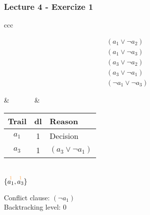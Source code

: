 \begin{frame}
\begin{columns}
    \begin{column}{5cm}
      \begin{overlayarea}{5cm}{5cm}
	\only<1|handout:0>{\scalebox{.6}{}}
	\only<2|handout:0>{\scalebox{.6}{}}
	\only<3,4,5|handout:0>{\scalebox{.6}{}}
	\only<6,7|handout:0>{\scalebox{.6}{}}
	\only<8|handout:0>{\scalebox{.6}{}}
	\only<9|handout:0>{\scalebox{.6}{}}
	\only<10-12|handout:0>{\scalebox{.6}{}}
	\only<13->{\scalebox{.6}{}}
      \end{overlayarea}
    \end{column}

  \end{columns}

\end{frame}

\begin{frame}
  \frametitle{Lecture 4 - Exercize 1}

  \scriptsize

  \begin{tabular}{ccc}
    \begin{minipage}{.4\textwidth}
     $$
     \begin{array}{l}
     (a_1 \vee \neg a_2) \\
     (a_1 \vee \neg a_3) \\
     (a_3 \vee \neg a_2) \\
     (a_3 \vee \neg a_1) \\
     (\neg a_1 \vee \neg a_3)
     \end{array}
     $$
    \end{minipage}
    & ~~~~~~ &
    \begin{minipage}{.4\textwidth}
      \begin{tabular}{ccl}
	\hline
	Trail & dl & Reason \\
	\hline
	$a_1$ & 1 & Decision \\
	$a_3$ & 1 & $(a_3 \vee \neg a_1)$ \\
	\hline
      \end{tabular}
      \bigskip \\
      $\{ \dec{a_1}{1}, \dec{a_3}{1} \}$
    \end{minipage}
  \end{tabular}

  \vfill
  \pause

  \begin{minipage}{\textwidth}
    \begin{prooftree}
    \end{prooftree}
  \end{minipage}

  \vfill
  \pause
  Conflict clause: $(\neg a_1)$ \pause \\
  Backtracking level: 0
\end{frame}


